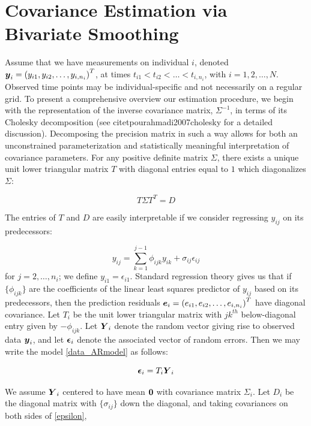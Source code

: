 \documentclass[12pt]{article}
\newcommand{\bfeps}{\mbox{\boldmath $\epsilon$}}
\newcommand{\bfe}{\mbox{\boldmath $e$}}
\newcommand{\bfo}{\mbox{\boldmath $0$}}
\newcommand{\bfy}{\mbox{\boldmath $y$}}
\newcommand{\bfY}{\mbox{\boldmath $Y$}}
\theoremstyle{definition}
\begin{document}
\section{Covariance Estimation via Bivariate Smoothing}

Assume that we have measurements on individual $i$, denoted $\bfy_i = \left( y_{i1}, y_{i2}, \dots, y_{i,n_i} \right)^T$, at times $t_{i1} < t_{i2} < \dots< t_{i,n_i}$, with $i=1,2,\dots,N$. Observed time points may be individual-specific and not necessarily on a regular grid. To present a comprehensive overview our estimation procedure, we begin with the representation of the inverse covariance matrix, $\Sigma^{-1}$, in terms of its Cholesky decomposition (see citet{pourahmadi2007cholesky} for a detailed discussion). Decomposing the precision matrix in such a way allows for both an unconstrained parameterization and statistically meaningful interpretation of covariance parameters. For any positive definite matrix $\Sigma$, there exists a unique unit lower triangular matrix $T$ with diagonal entries equal to $1$ which diagonalizes $\Sigma$:

\begin{equation}
\nonumber T \Sigma T^T = D
\end{equation}
\noindent

The entries of $T$ and $D$ are easily interpretable if we consider regressing $y_{ij}$ on its predecessors: 

\begin{equation}
{y}_{ij}  = \sum_{k=1}^{j-1} \phi_{ijk} y_{ik} + \sigma_{ij}\epsilon_{ij} \label{data_ARmodel}
\end{equation}
\noindent
for $j=2,\dots,n_i$; we define $y_{i1}=\epsilon_{i1}$. Standard regression theory gives us that if $\lbrace \phi_{ijk} \rbrace$ are the coefficients of the linear least squares predictor of $y_{ij}$ based on its predecessors, then the prediction residuals $\bfe_i =\left( e_{i1}, e_{i2},\dots, e_{i,n_i} \right)^T$ have diagonal covariance. Let $T_i$ be the unit lower triangular matrix with $jk^{th}$ below-diagonal entry given by $-\phi_{ijk}$. Let $\bfY_i$ denote the random vector giving rise to observed data $\bfy_i$, and let $\bfeps_i$ denote the associated vector of random errors. Then we may write the model \eqref{data_ARmodel} as follows: 

\begin{equation}
\bfeps_i = T_i \bfY_i \label{epsilon}
\end{equation}

We assume $\bfY_i$ centered to have mean $\bfo$ with covariance matrix $\Sigma_i$. Let $D_i$ be the diagonal matrix with $\lbrace \sigma_{ij} \rbrace$ down the diagonal, and taking covariances on both sides of \eqref{epsilon}, 
\end{document}
